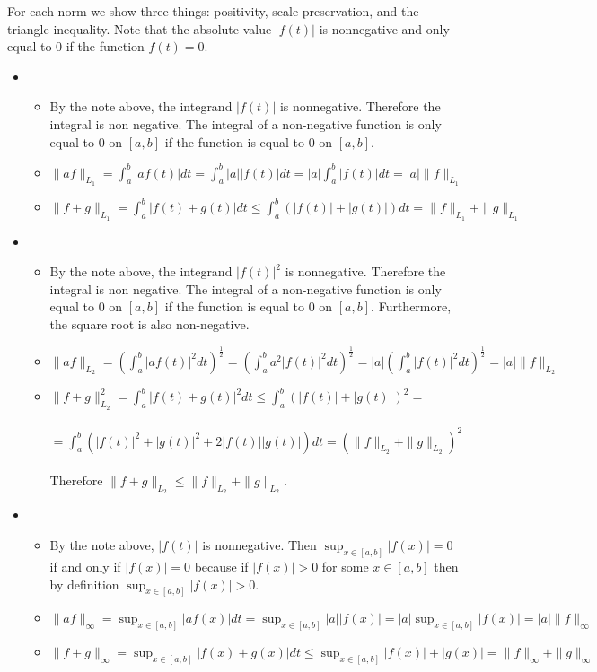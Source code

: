 \documentclass[12pt]{article}
\newenvironment{problem}[2][Problem]{\begin{trivlist}
\item[\hskip \labelsep {\bfseries #1}\hskip \labelsep {\bfseries #2}]}{\end{trivlist}}
\begin{document}
\begin{problem}{24.} For each norm we show three things: positivity, scale preservation, and the triangle inequality. Note that the absolute value $| f(t) |$ is nonnegative and only equal to $0$ if the function $f(t) = 0$.
\begin{itemize}
\item [(1)]\begin{itemize}
\item [(i)] By the note above, the integrand $| f(t)|$ is nonnegative. Therefore the integral is non negative. The integral of a non-negative function is only equal to $0$ on $[a,b]$ if the function is equal to $0$ on $[a,b]$. 
\item [(ii)] $\|af\|_{L_1} = \int_a^b |af(t)| dt = \int_a^b |a||f(t)| dt = |a|\int_a^b |f(t)| dt = |a| \|f\|_{L_1}$
\item [(iii)] $\|f + g\|_{L_1} = \int_a^b |f(t) + g(t)| dt \leq \int_a^b( |f(t)| + |g(t)|) dt = \|f\|_{L_1} + \|g\|_{L_1}$

\end{itemize} 
\item [(2)] \begin{itemize}
\item [(i)] By the note above, the integrand $| f(t)|^2$ is nonnegative. Therefore the integral is non negative. The integral of a non-negative function is only equal to $0$ on $[a,b]$ if the function is equal to $0$ on $[a,b]$. Furthermore, the square root is also non-negative. 
\item [(ii)] $\|af\|_{L_2} = \left(\int_a^b |af(t)|^2 dt\right)^{\frac{1}{2}} =  \left(\int_a^b a^2|f(t)|^2 dt\right)^{\frac{1}{2}}  =  |a|\left(\int_a^b |f(t)|^2 dt\right)^{\frac{1}{2}}  = |a| \|f\|_{L_2}$
\item [(iii)] $\|f + g\|_{L_2}^2 = \int_a^b |f(t) + g(t)|^2 dt  \leq \int_a^b (|f(t)| + |g(t)|)^2  = $ \\\\
$ = \int_a^b( |f(t)|^2 + |g(t)|^2 +2|f(t)||g(t)|) dt = (\|f\|_{L_2} + \|g\|_{L_2})^2$\\\\
Therefore $\|f + g\|_{L_2} \leq \|f\|_{L_2} + \|g\|_{L_2}$. 
\end{itemize} 

\item [(3)]
\begin{itemize}
\item [(i)] By the note above, $| f(t)|$ is nonnegative. Then $\sup_{x\in [a,b]} |f(x)| = 0$ if and only if  $| f(x) | = 0$ because if $| f(x) | > 0$ for some $x \in [a,b]$ then by definition $\sup_{x\in [a,b]} |f(x)| > 0$. 
\item [(ii)] $\|af\|_{\infty}=  \sup_{x\in [a,b]} |af(x)| dt =  \sup_{x\in [a,b]}  |a||f(x)|= |a| \sup_{x\in [a,b]} |f(x)|  = |a| \|f\|_{\infty}$
\item [(iii)] $\|f + g\|_{\infty}=  \sup_{x\in [a,b]} |f(x) + g(x)| dt \leq  \sup_{x\in [a,b]} |f(x)| + |g(x)| = \|f\|_{\infty} + \|g\|_{\infty}$
\end{itemize} 
\end{itemize} 
\end{problem}
\end{document}
